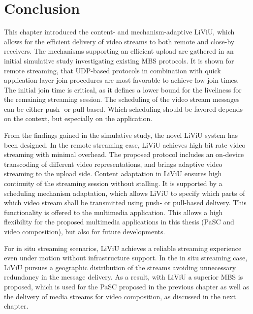 \section{Conclusion}
\label{sec:540_conclusion}
This chapter introduced the content- and mechanism-adaptive \ac{LiViU}, which allows for the efficient delivery of video streams to both remote and close-by receivers.
The mechanisms supporting an efficient upload are gathered in an initial simulative study investigating existing \ac{MBS} protocols.
It is shown for remote streaming, that \ac{UDP}-based protocols in combination with quick application-layer join procedures are most favorable to achieve low join times.
The initial join time is critical, as it defines a lower bound for the liveliness for the remaining streaming session.
The scheduling of the video stream messages can be either push- or pull-based.
Which scheduling should be favored depends on the context, but especially on the application.

From the findings gained in the simulative study, the novel \ac{LiViU} system has been designed.
In the remote streaming case, \ac{LiViU} achieves high bit rate video streaming with minimal overhead.
The proposed protocol includes an on-device transcoding of different video representations, and brings adaptive video streaming to the upload side. 
Content adaptation in \ac{LiViU} ensures high continuity of the streaming session without stalling.
It is supported by a scheduling mechanism adaptation, which allows \ac{LiViU} to specify which parts of which video stream shall be transmitted using push- or pull-based delivery.
This functionality is offered to the multimedia application.
This allows a high flexibility for the proposed multimedia applications in this thesis (\ac{PaSC} and video composition), but also for future developments.

For in situ streaming scenarios, \ac{LiViU} achieves a reliable streaming experience even under motion without infrastructure support.
In the in situ streaming case, \ac{LiViU} pursues a geographic distribution of the streams avoiding unnecessary redundancy in the message delivery.
As a result, with \ac{LiViU} a superior \ac{MBS} is proposed, which is used for the \ac{PaSC} proposed in the previous chapter as well as the delivery of media streams for video composition, as discussed in the next chapter.